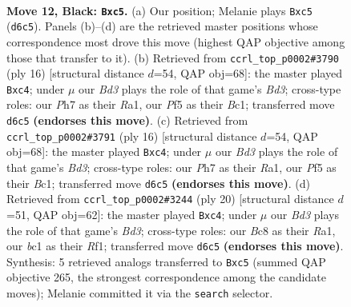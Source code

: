 \documentclass[11pt]{article}
\begin{document}
\clearpage

\begin{figure}[p]\centering
\begin{subfigure}{0.46\textwidth}\centering
\resizebox{\linewidth}{!}{%
\newchessgame
\chessboard[
  setfen={r1b2rk1/pp2q1pp/n2b1n2/P1Pp1p2/7P/4PNP1/1P3PB1/RNBQ1RK1 b - - 0 12},
  showmover=false,
  pgfstyle=straightmove, color=movearrow, markmove={d6-c5}
]}
\caption{}
\end{subfigure}\hfill
\begin{subfigure}{0.46\textwidth}\centering
\resizebox{\linewidth}{!}{%
\newchessgame
\chessboard[
  setfen={rnbq1rk1/pp3ppp/4pn2/8/1bpP4/2NB1N2/PP3PPP/R1BQ1RK1 w - - 0 9},
  showmover=false,
  pgfstyle=straightmove, color=movearrow, markmove={d3-c4}
]}
\caption{}
\end{subfigure}
\\[4pt]
\begin{subfigure}{0.46\textwidth}\centering
\resizebox{\linewidth}{!}{%
\newchessgame
\chessboard[
  setfen={rnbq1rk1/pp3ppp/4pn2/8/1bpP4/2NB1N2/PP3PPP/R1BQ1RK1 w - - 0 9},
  showmover=false,
  pgfstyle=straightmove, color=movearrow, markmove={d3-c4}
]}
\caption{}
\end{subfigure}\hfill
\begin{subfigure}{0.46\textwidth}\centering
\resizebox{\linewidth}{!}{%
\newchessgame
\chessboard[
  setfen={rnbq1rk1/pp2ppbp/5np1/8/2pP4/2NB1N1P/PP3PP1/R1BQ1RK1 w - - 0 11},
  showmover=false,
  pgfstyle=straightmove, color=movearrow, markmove={d3-c4}
]}
\caption{}
\end{subfigure}
\caption{\textbf{Move 12, Black: \texttt{Bxc5}.} (a) Our position; Melanie plays \texttt{Bxc5} (\texttt{d6c5}). Panels (b)--(d) are the retrieved master positions whose correspondence most drove this move (highest QAP objective among those that transfer to it). (b) Retrieved from \texttt{ccrl\_top\_p0002\#3790} (ply 16) [structural distance $d$=54, QAP obj=68]: the master played \texttt{Bxc4}; under $\mu$ our \emph{Bd3} plays the role of that game's \emph{Bd3}; cross-type roles: our \emph{P}h7 as their \emph{R}a1, our \emph{P}f5 as their \emph{B}c1; transferred move \texttt{d6c5} \textbf{(endorses this move)}. (c) Retrieved from \texttt{ccrl\_top\_p0002\#3791} (ply 16) [structural distance $d$=54, QAP obj=68]: the master played \texttt{Bxc4}; under $\mu$ our \emph{Bd3} plays the role of that game's \emph{Bd3}; cross-type roles: our \emph{P}h7 as their \emph{R}a1, our \emph{P}f5 as their \emph{B}c1; transferred move \texttt{d6c5} \textbf{(endorses this move)}. (d) Retrieved from \texttt{ccrl\_top\_p0002\#3244} (ply 20) [structural distance $d$=51, QAP obj=62]: the master played \texttt{Bxc4}; under $\mu$ our \emph{Bd3} plays the role of that game's \emph{Bd3}; cross-type roles: our \emph{B}c8 as their \emph{R}a1, our \emph{b}c1 as their \emph{R}f1; transferred move \texttt{d6c5} \textbf{(endorses this move)}. Synthesis: 5 retrieved analogs transferred to \texttt{Bxc5} (summed QAP objective 265, the strongest correspondence among the candidate moves); Melanie committed it via the \texttt{search} selector.}
\label{fig:thought-m23}
\end{figure}
\end{document}
